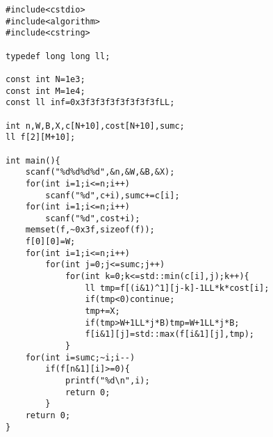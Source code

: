\documentclass{article}
\begin{document}
	\begin{lstlisting}
#include<cstdio>
#include<algorithm>
#include<cstring>

typedef long long ll;

const int N=1e3;
const int M=1e4;
const ll inf=0x3f3f3f3f3f3f3f3fLL;

int n,W,B,X,c[N+10],cost[N+10],sumc;
ll f[2][M+10];

int main(){
	scanf("%d%d%d%d",&n,&W,&B,&X);
	for(int i=1;i<=n;i++)
		scanf("%d",c+i),sumc+=c[i];
	for(int i=1;i<=n;i++)
		scanf("%d",cost+i);
	memset(f,~0x3f,sizeof(f));
	f[0][0]=W;
	for(int i=1;i<=n;i++)
		for(int j=0;j<=sumc;j++)
			for(int k=0;k<=std::min(c[i],j);k++){
				ll tmp=f[(i&1)^1][j-k]-1LL*k*cost[i];
				if(tmp<0)continue;
				tmp+=X;
				if(tmp>W+1LL*j*B)tmp=W+1LL*j*B;
				f[i&1][j]=std::max(f[i&1][j],tmp);
			}
	for(int i=sumc;~i;i--)
		if(f[n&1][i]>=0){
			printf("%d\n",i);
			return 0;
		}
	return 0;
}
	\end{lstlisting}
\end{document}
